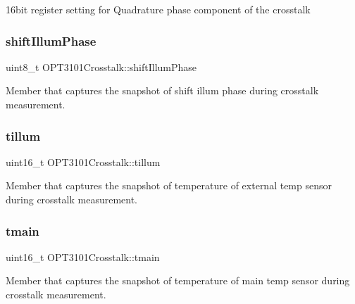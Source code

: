 16bit register setting for Quadrature phase component of the crosstalk 

\mbox{\label{class_o_p_t3101_crosstalk_a48d662e8b0e764481e3aceb04ee857b0}} 
\subsubsection{\texorpdfstring{shift\+Illum\+Phase}{shiftIllumPhase}}
{\footnotesize\ttfamily uint8\+\_\+t O\+P\+T3101\+Crosstalk\+::shift\+Illum\+Phase}



Member that captures the snapshot of shift illum phase during crosstalk measurement. 

\mbox{\label{class_o_p_t3101_crosstalk_a88191108ac32b8cc9a25309ff5beae08}} 
\subsubsection{\texorpdfstring{tillum}{tillum}}
{\footnotesize\ttfamily uint16\+\_\+t O\+P\+T3101\+Crosstalk\+::tillum}



Member that captures the snapshot of temperature of external temp sensor during crosstalk measurement. 

\mbox{\label{class_o_p_t3101_crosstalk_af5ac7c2a662a32e1ad954412a3c8d6ea}} 
\subsubsection{\texorpdfstring{tmain}{tmain}}
{\footnotesize\ttfamily uint16\+\_\+t O\+P\+T3101\+Crosstalk\+::tmain}



Member that captures the snapshot of temperature of main temp sensor during crosstalk measurement. 

\mbox{\label{class_o_p_t3101_crosstalk_a5a84d979d127f7624e6f19830b739d5e}} 

